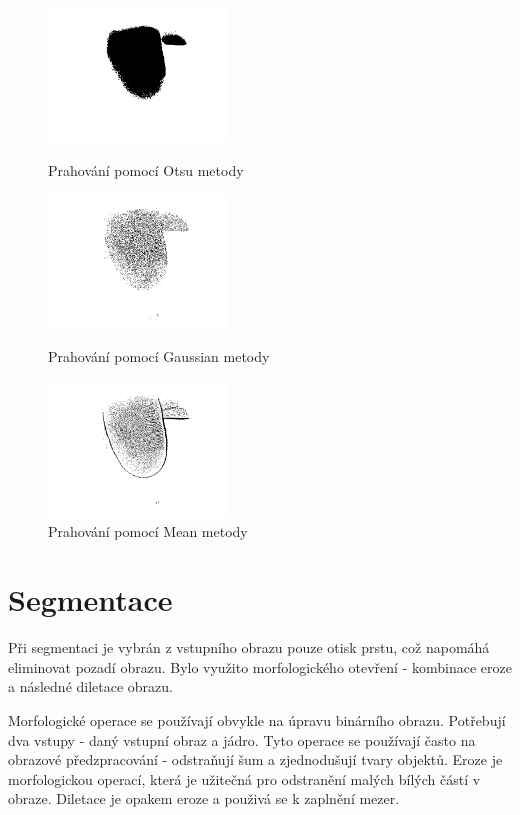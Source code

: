 \begin{figure}[!htbp]
  \begin{minipage}[b]{0.3\linewidth}
    \centering
    \includegraphics[width=180px]{obrazky-figures/live25otsu.png}
    \caption{Prahování pomocí Otsu metody}
  \end{minipage}
  \hspace{0.3cm}
  \begin{minipage}[b]{0.3\linewidth}
    \centering
    \includegraphics[width=180px]{obrazky-figures/live25gauss.png}
    \caption{Prahování pomocí Gaussian metody}
  \end{minipage}
  \hspace{0.3cm}
    \begin{minipage}[b]{0.3\linewidth}
    \centering
    \includegraphics[width=180px]{obrazky-figures/live25mean.png}
    \caption{Prahování pomocí Mean metody}
  \end{minipage}
\end{figure}
\section{Segmentace}
Při segmentaci je vybrán z vstupního obrazu pouze otisk prstu, což napomáhá eliminovat pozadí obrazu. Bylo využito morfologického otevření - kombinace eroze a následné diletace obrazu.

Morfologické operace se používají obvykle na úpravu binárního obrazu. Potřebují dva vstupy - daný vstupní obraz a jádro. \cite{OpenCVMorphology} Tyto operace se používají často na obrazové předzpracování - odstraňují šum a zjednodušují tvary objektů. Eroze je morfologickou operací, která je užitečná pro odstranění malých bílých částí v obraze. Diletace je opakem eroze a použivá se k zaplnění mezer. \cite{ExerciseMorphology}

